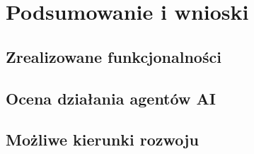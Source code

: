 \chapter{Podsumowanie i wnioski}

\section{Zrealizowane funkcjonalności}

\section{Ocena działania agentów AI}

\section{Możliwe kierunki rozwoju}
